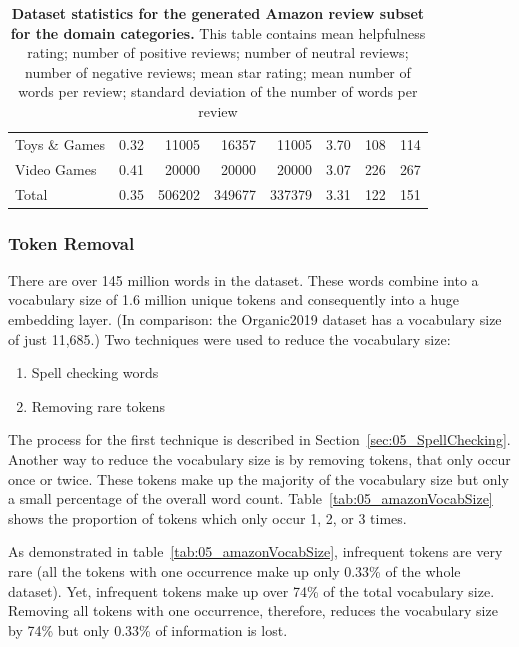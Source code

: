 \begin{table}
\begin{tabularx}{\textwidth}{lXrrrcrr}
        Toys \& Games               &   0.32 &  11005 & 16357 & 11005 &    3.70 &    108 &  114 \\
        Video Games                 &   0.41 &   20000 &      20000 & 20000 &    3.07 &    226 &  267 \\
        \midrule
        Total                        &    0.35 &        506202 &    349677& 337379&    3.31 &     122 &  151 \\
        \bottomrule
    \end{tabularx}
    \caption{\textbf{Dataset statistics for the generated Amazon review subset for the domain categories.} This table contains mean helpfulness rating; number of positive reviews; number of neutral reviews; number of negative reviews; mean star rating; mean number of words per review; standard deviation of the number of words per review }
        \label{tab:05_amazonDatasetStats}
\end{table}

\subsubsection*{Token Removal}
\label{sec:05_amazonTokens}
There are over 145 million words in the dataset. These words combine into a vocabulary size of 1.6 million unique tokens and consequently into a huge embedding layer. {(In comparison: the Organic2019 dataset has a vocabulary size of just 11,685.)} Two techniques were used to reduce the vocabulary size:

\begin{enumerate}
    \item Spell checking words
    \item Removing rare tokens
\end{enumerate}

The process for the first technique is described in Section~\ref{sec:05_SpellChecking}. Another way to reduce the vocabulary size is by removing tokens, that only occur once or twice. These tokens make up the majority of the vocabulary size but only a small percentage of the overall word count. Table~\ref{tab:05_amazonVocabSize} shows the proportion of tokens which only occur 1, 2, or 3 times.

As demonstrated in table~\ref{tab:05_amazonVocabSize}, infrequent tokens are very rare {(all the tokens with one occurrence make up only 0.33\% of the whole dataset)}. Yet, infrequent tokens make up over 74\% of the total vocabulary size. Removing all tokens with one occurrence, therefore, reduces the vocabulary size by 74\% but only 0.33\% of information is lost.

